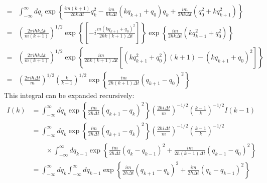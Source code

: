 \documentclass[12pt,a4]{article}
\begin{document}
\begin{enumerate}
\begin{align*}
                                                                                                                        =& \int_{-\infty}^\infty dq_i \exp\left\{\frac{im(k + 1)}{2\hbar k \Delta t} q_{k}^2 -\frac{im}{\hbar k\Delta t} (kq_{k + 1} + q_{0}) q_k + \frac{im}{2\hbar k\Delta t} \left(q_{0}^2 + k q_{k + 1}^2\right) \right\}\\
                                                                                                                        =& \left(\frac{2 \pi i \hbar  k\Delta t}{ m (k + 1)}\right)^{1/2}\exp\left\{\left[-i \frac{m(kq_{k + 1} + q_{0})^2}{2\hbar k(k + 1)\Delta t} \right]\right\}  \exp\left\{\frac{im}{2\hbar k  \Delta t}\left(k q_{k + 1}^2 + q_{0}^2\right)\right\} \\
                                                                                                                        =& \left(\frac{2 \pi i \hbar  k\Delta t}{ m (k + 1)}\right)^{1/2}\exp\left\{\frac{im}{2 \hbar k (k + 1) \Delta t}\left[\left(k q_{k + 1}^2 + q_{0}^2\right)(k + 1) - (kq_{k + 1} + q_{0})^2 \right]\right\}\\
                                                                                                                        =& \left(\frac{2 \pi i \hbar  \Delta t}{ m }\right)^{1/2}\left(\frac{k}{k+1}\right)^{1/2}\exp\left\{\frac{im}{2 \hbar  (k + 1) \Delta t}\left(q_{k + 1} - q_{0}\right)^2\right\}
    \end{align*}
    This integral can be expanded recursively:
    \begin{align*}
      I(k) &= \int_{-\infty}^\infty dq_k \exp\left\{\frac{im}{2\hbar \Delta t}\left(q_{k+1} - q_{k}\right)^2\right\} \left(\frac{2 \hbar i \Delta t}{m}\right)^{-1/2}\left( \frac{k - 1}{k}\right)^{-1/2}I(k-1) \\
           &= \int_{-\infty}^\infty dq_k \exp\left\{\frac{im}{2\hbar \Delta t}\left(q_{k+1} - q_{k}\right)^2\right\}\left(\frac{2 \hbar i \Delta t}{m}\right)^{-1/2}\left( \frac{k - 1}{k}\right)^{-1/2}\\
           &\qquad\times \int_{-\infty}^\infty dq_{k-1}\exp\left\{\frac{im}{2\hbar \Delta t}\left(q_{k} - q_{k-1}\right)^2 + \frac{im}{2\hbar (k-1)\Delta t}\left(q_{k-1} - q_{0}\right)^2\right\}\\
           &= \int_{-\infty}^\infty dq_k \int_{-\infty}^\infty dq_{k-1}\exp\left\{\frac{im}{2\hbar \Delta t}\left(q_{k+1} - q_{k}\right)^2 + \frac{im}{2\hbar \Delta t}\left(q_{k} - q_{k-1}\right)^2\right\}\\

\end{align*}
\end{enumerate}
\end{document}
